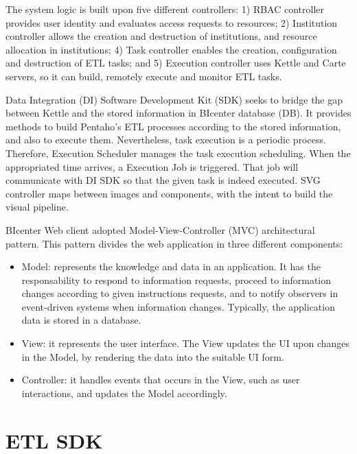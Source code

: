 \documentclass[
  11pt,
]{krantz}
\providecommand{\tightlist}{%
  \setlength{\itemsep}{0pt}\setlength{\parskip}{0pt}}
\begin{document}
The system logic is built upon five different controllers: 1) RBAC controller provides user identity and evaluates access requests to resources; 2) Institution controller allows the creation and destruction of institutions, and resource allocation in institutions; 4) Task controller enables the creation, configuration and destruction of ETL tasks; and 5) Execution controller uses Kettle and Carte servers, so it can build, remotely execute and monitor ETL tasks.

Data Integration (DI) Software Development Kit (SDK) seeks to bridge the gap between Kettle and the stored information in BIcenter database (DB). It provides methods to build Pentaho's ETL processes according to the stored information, and also to execute them. Nevertheless, task execution is a periodic process. Therefore, Execution Scheduler manages the task execution scheduling. When the appropriated time arrives, a Execution Job is triggered. That job will communicate with DI SDK so that the given task is indeed executed. SVG controller maps between images and components, with the intent to build the visual pipeline.

BIcenter Web client adopted Model-View-Controller (MVC) architectural pattern. This pattern divides the web application in three different components:

\begin{itemize}
\tightlist
\item
  Model: represents the knowledge and data in an application. It has the responsability to respond to information requests, proceed to information changes according to given instructions requests, and to notify observers in event-driven systems when information changes. Typically, the application data is stored in a database.
\item
  View: it represents the user interface. The View updates the UI upon changes in the Model, by rendering the data into the suitable UI form.
\item
  Controller: it handles events that occurs in the View, such as user interactions, and updates the Model accordingly.
\end{itemize}

\hypertarget{etl-sdk}{%
\section{ETL SDK}\label{etl-sdk}}
\end{document}
